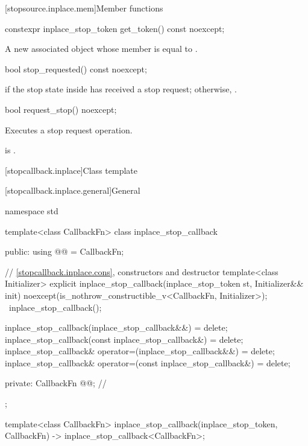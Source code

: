 [stopsource.inplace.mem]{Member functions}

%
\begin{itemdecl}
constexpr inplace_stop_token get_token() const noexcept;
\end{itemdecl}

\begin{itemdescr}
\pnum
\returns
A new associated  object
whose  member is equal to .
\end{itemdescr}

%
\begin{itemdecl}
bool stop_requested() const noexcept;
\end{itemdecl}

\begin{itemdescr}
\pnum
\returns
{} if the stop state inside 
has received a stop request; otherwise, .
\end{itemdescr}

%
\begin{itemdecl}
bool request_stop() noexcept;
\end{itemdecl}

\begin{itemdescr}
\pnum
\effects
Executes a stop request operation.

\pnum
\ensures
{} is .
\end{itemdescr}

[stopcallback.inplace]{Class template }

[stopcallback.inplace.general]{General}

%
\begin{codeblock}
namespace std {
  template<class CallbackFn>
  class inplace_stop_callback {
  public:
    using @@ = CallbackFn;

    // \ref{stopcallback.inplace.cons}, constructors and destructor
    template<class Initializer>
      explicit inplace_stop_callback(inplace_stop_token st, Initializer&& init)
        noexcept(is_nothrow_constructible_v<CallbackFn, Initializer>);
    ~inplace_stop_callback();

    inplace_stop_callback(inplace_stop_callback&&) = delete;
    inplace_stop_callback(const inplace_stop_callback&) = delete;
    inplace_stop_callback& operator=(inplace_stop_callback&&) = delete;
    inplace_stop_callback& operator=(const inplace_stop_callback&) = delete;

  private:
    CallbackFn @@;                                     // \expos
  };

  template<class CallbackFn>
    inplace_stop_callback(inplace_stop_token, CallbackFn)
      -> inplace_stop_callback<CallbackFn>;
}
\end{codeblock}

